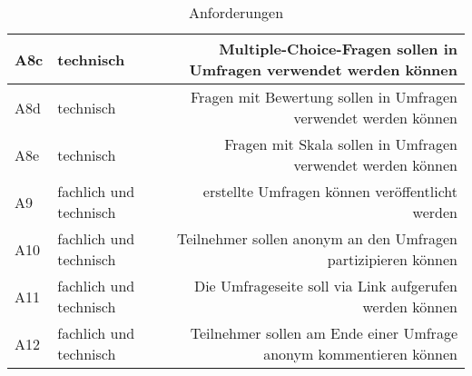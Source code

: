 \begin{table}[!htbp]
\begin{tabularx}{\textwidth}{l|k|r}
      {\label{Anf:A8c}A8c} & technisch & Multiple-Choice-Fragen sollen in Umfragen verwendet werden können \\
      \hline
      {\label{Anf:A8d}A8d} & technisch & Fragen mit Bewertung sollen in Umfragen verwendet werden können \\
      \hline
      {\label{Anf:A8e}A8e} & technisch & Fragen mit Skala sollen in Umfragen verwendet werden können \\
      \hline
      {\label{Anf:A9}A9} & fachlich und technisch & erstellte Umfragen können veröffentlicht werden \\
      \hline
      {\label{Anf:A10}A10} & fachlich und technisch & Teilnehmer sollen anonym an den Umfragen partizipieren können \\
      \hline
      {\label{Anf:A11}A11} & fachlich und technisch & Die Umfrageseite soll via Link aufgerufen werden können \\
      \hline
      {\label{Anf:A12}A12} & fachlich und technisch & Teilnehmer sollen am Ende einer Umfrage anonym kommentieren können \\
      \hline
      \bottomrule
    \end{tabularx}
    \caption{Anforderungen}
    \label{tab:Anforderungen}
\end{table}